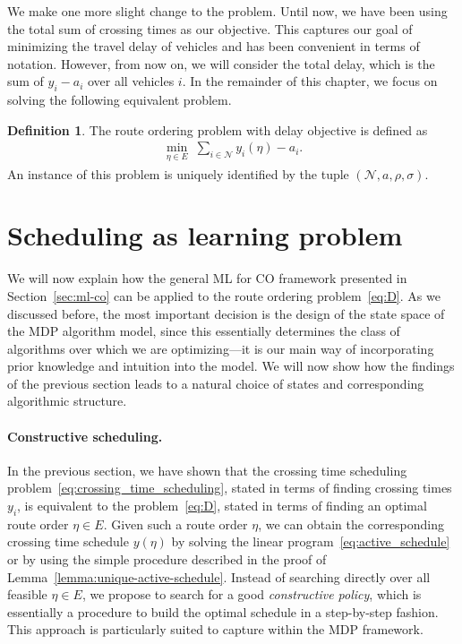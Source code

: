\documentclass[a4paper]{report}
\theoremstyle{definition}
\newtheorem{define}{Definition}[chapter]
\theoremstyle{plain}
\begin{document}
We make one more slight change to the problem. Until now, we have been using the
total sum of crossing times as our objective. This captures our goal of
minimizing the travel delay of vehicles and has been convenient in terms of
notation. However, from now on, we will consider the total delay, which is the
sum of $y_i - a_i$ over all vehicles $i$.
%
In the remainder of this chapter, we focus on solving the following equivalent
problem.

\begin{define}
  The route ordering problem with delay objective is defined as
  \begin{align}
    \label{eq:D}\tag{D}
    \min_{\eta \in E} \; \sum_{i \in \mathcal{N}} y_i(\eta) - a_i .
  \end{align}
  An instance of this problem is uniquely identified by the tuple
  $(\mathcal{N}, a, \rho, \sigma)$.
\end{define}

\clearpage

\section{Scheduling as learning problem}\label{sec:seq-modeling}

We will now explain how the general ML for CO framework presented in Section~\ref{sec:ml-co}
can be applied to the route ordering problem~\eqref{eq:D}.
%
As we discussed before, the most important decision is the design of the state
space of the MDP algorithm model, since this essentially determines the class of
algorithms over which we are optimizing---it is our main way of incorporating
prior knowledge and intuition into the model.
%
We will now show how the findings of the previous section leads to a natural
choice of states and corresponding algorithmic structure.

\paragraph{Constructive scheduling.}
In the previous section, we have shown that the crossing time scheduling
problem~\eqref{eq:crossing_time_scheduling}, stated in terms of finding crossing times $y_i$, is equivalent to
the problem~\eqref{eq:D}, stated in terms of finding an optimal route order $\eta \in E$.
Given such a route order $\eta$, we can obtain the corresponding crossing time
schedule $y(\eta)$ by solving the linear program~\eqref{eq:active_schedule} or by using the simple
procedure described in the proof of Lemma~\ref{lemma:unique-active-schedule}.
%
Instead of searching directly over all feasible $\eta \in E$, we propose to search
for a good \emph{constructive policy}, which is essentially a procedure to build the
optimal schedule in a step-by-step fashion. This approach is particularly suited
to capture within the MDP framework.
\end{document}

